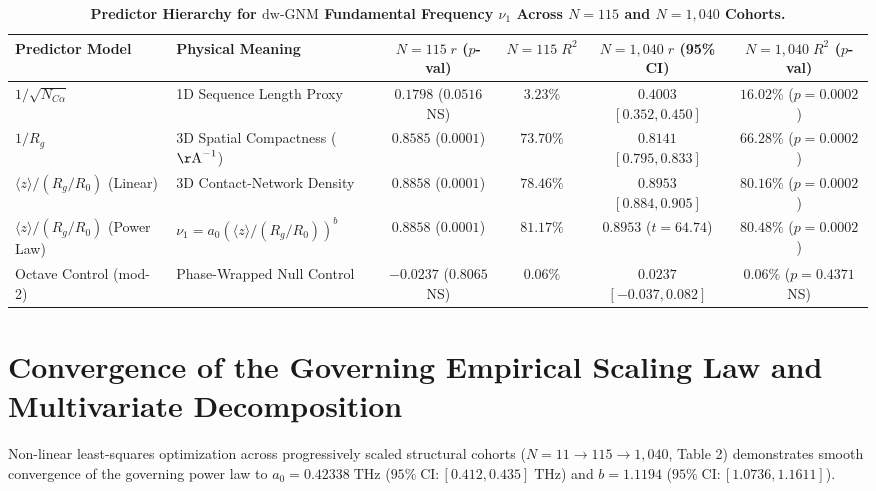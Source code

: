 \documentclass[11pt,onecolumn,letterpaper]{article}
\begin{document}
\begin{table}[h!]
\centering
\caption{\textbf{Predictor Hierarchy for $\mathrm{dw\text{-}GNM}$ Fundamental Frequency $\nu_1$ Across $N = 115$ and $N = 1,040$ Cohorts.}}
\vspace{4pt}
\footnotesize
\begin{tabular}{llcccc}
\toprule
\textbf{Predictor Model} & \textbf{Physical Meaning} & \textbf{$N=115\;r$ ($p$-val)} & \textbf{$N=115\;R^2$} & \textbf{$N=1,040\;r$ (95\% CI)} & \textbf{$N=1,040\;R^2$ ($p$-val)} \\
\midrule
$1/\sqrt{N_{C\alpha}}$ & 1D Sequence Length Proxy & $0.1798$ ($0.0516$ NS) & $3.23\%$ & $0.4003$ $[0.352, 0.450]$ & $16.02\%$ ($p = 0.0002$) \\
$1/R_g$ & 3D Spatial Compactness ($\mathrm{\AA}^{-1}$) & $0.8585$ ($0.0001$) & $73.70\%$ & $0.8141$ $[0.795, 0.833]$ & $66.28\%$ ($p = 0.0002$) \\
$\langle z \rangle / (R_g/R_0)$ (Linear) & 3D Contact-Network Density & $0.8858$ ($0.0001$) & $78.46\%$ & $0.8953$ $[0.884, 0.905]$ & $80.16\%$ ($p = 0.0002$) \\
$\langle z \rangle / (R_g/R_0)$ (Power Law) & $\nu_1 = a_0 (\langle z \rangle / (R_g/R_0))^b$ & $0.8858$ ($0.0001$) & $\mathbf{81.17\%}$ & $0.8953$ ($t = 64.74$) & $\mathbf{80.48\%}$ ($p = 0.0002$) \\
Octave Control (mod-2) & Phase-Wrapped Null Control & $-0.0237$ ($0.8065$ NS) & $0.06\%$ & $0.0237$ $[-0.037, 0.082]$ & $0.06\%$ ($p = 0.4371$ NS) \\
\bottomrule
\end{tabular}
\end{table}

\section{Convergence of the Governing Empirical Scaling Law and Multivariate Decomposition}
Non-linear least-squares optimization across progressively scaled structural cohorts ($N = 11 \rightarrow 115 \rightarrow 1,040$, Table 2) demonstrates smooth convergence of the governing power law to $a_0 = 0.42338\;\mathrm{THz}$ ($95\%\;\mathrm{CI}: [0.412, 0.435]\;\mathrm{THz}$) and $b = 1.1194$ ($95\%\;\mathrm{CI}: [1.0736, 1.1611]$).
\end{document}
